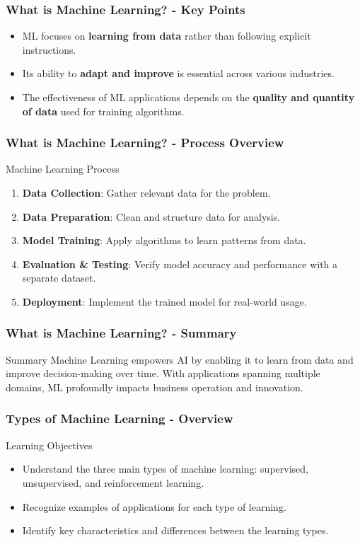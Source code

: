 \documentclass[aspectratio=169]{beamer}
\begin{document}
\begin{frame}[fragile]
    \frametitle{What is Machine Learning? - Key Points}
    \begin{itemize}
        \item ML focuses on \textbf{learning from data} rather than following explicit instructions.
        \item Its ability to \textbf{adapt and improve} is essential across various industries.
        \item The effectiveness of ML applications depends on the \textbf{quality and quantity of data} used for training algorithms.
    \end{itemize}
\end{frame}

\begin{frame}[fragile]
    \frametitle{What is Machine Learning? - Process Overview}
    \begin{block}{Machine Learning Process}
        \begin{enumerate}
            \item \textbf{Data Collection}: Gather relevant data for the problem.
            \item \textbf{Data Preparation}: Clean and structure data for analysis.
            \item \textbf{Model Training}: Apply algorithms to learn patterns from data.
            \item \textbf{Evaluation \& Testing}: Verify model accuracy and performance with a separate dataset.
            \item \textbf{Deployment}: Implement the trained model for real-world usage.
        \end{enumerate}
    \end{block}
\end{frame}

\begin{frame}[fragile]
    \frametitle{What is Machine Learning? - Summary}
    \begin{block}{Summary}
        Machine Learning empowers AI by enabling it to learn from data and improve decision-making over time. With applications spanning multiple domains, ML profoundly impacts business operation and innovation.
    \end{block}
\end{frame}

\begin{frame}[fragile]
    \frametitle{Types of Machine Learning - Overview}
    \begin{block}{Learning Objectives}
        \begin{itemize}
            \item Understand the three main types of machine learning: supervised, unsupervised, and reinforcement learning.
            \item Recognize examples of applications for each type of learning.
            \item Identify key characteristics and differences between the learning types.
        \end{itemize}
    \end{block}
\end{frame}
\end{document}
